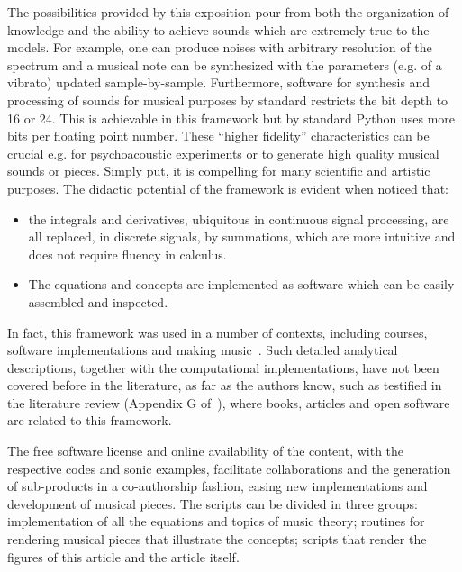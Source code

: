 The possibilities provided by this exposition pour from both the organization of knowledge and the ability to achieve sounds which are extremely true to the models.
For example, one can produce noises with arbitrary resolution of the spectrum and a musical note can be synthesized with the parameters (e.g. of a vibrato) updated sample-by-sample.
Furthermore, software for synthesis and processing of sounds for musical purposes
by standard restricts the bit depth to 16 or 24.
This is achievable in this framework but by standard Python uses more bits per floating point number.
These ``higher fidelity'' characteristics can be crucial
e.g. for psychoacoustic experiments or to generate high quality musical sounds or pieces.
Simply put, it is compelling
for many scientific and artistic purposes.
The didactic potential of the framework is evident when noticed that:
\begin{itemize}
	\item the integrals and derivatives, ubiquitous in continuous signal processing,
are all replaced, in discrete signals, by summations,
which are more intuitive and does not require fluency in calculus.
	\item The equations and concepts are implemented as software which can be easily assembled and inspected.
\end{itemize}
\noindent In fact, this framework was used in a number of contexts, including courses, software implementations and making music~\cite{vimeoLM,vivace,repoDissertacao,dissertacao}.
Such detailed analytical descriptions, together with the computational implementations, have not been covered before in the literature, as far as the authors know, such as testified in the literature review (Appendix G of~\cite{dissertacao}), where books, articles and open software are related to this framework.

The free software license and online availability of the content,
with the respective codes and sonic examples, facilitate collaborations and the generation of sub-products in a co-authorship fashion,
easing new implementations and development of musical pieces.
The scripts can be divided in three groups: implementation of all the equations and topics of music theory; routines for rendering musical pieces that illustrate the concepts; scripts that render the figures of this article and the article itself.


